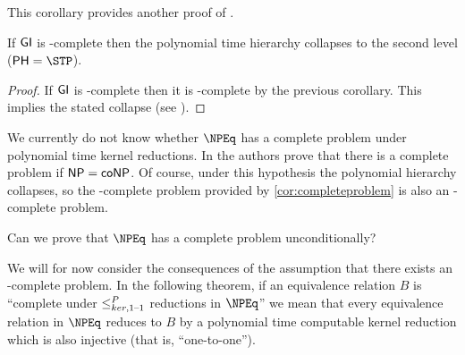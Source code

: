 This corollary provides another proof of \cite[Proposition~8.1]{bcffm}.

\begin{proposition}
  If ${\mathsf{GI}}$ is \NPEq-complete then the polynomial time hierarchy collapses to the second level ($\PH=\STP$).
\end{proposition}
\begin{proof}
  If ${\mathsf{GI}}$ is \NPEq-complete then it is \NP-complete by the previous corollary.
  This implies the stated collapse (see \cite{schoning87}).
\end{proof}

We currently do not know whether $\NPEq$ has a complete problem under polynomial time kernel reductions.
In \cite{bcffm} the authors prove that there is a complete problem if ${\mathsf{NP}}={\mathsf{coNP}}$.
Of course, under this hypothesis the polynomial hierarchy collapses, so the \NPcoNPEq-complete problem provided by \autoref{cor:completeproblem} is also an \NPEq-complete problem.
\begin{openproblem}
  Can we prove that $\NPEq$ has a complete problem unconditionally?
\end{openproblem}

We will for now consider the consequences of the assumption that there exists an \NPEq-complete problem.
In the following theorem, if an equivalence relation $B$ is ``complete under $\leq^{P}_{ker,1\text{--}1}$ reductions in $\NPEq$'' we mean that every equivalence relation in $\NPEq$ reduces to $B$ by a polynomial time computable kernel reduction which is also injective (that is, ``one-to-one'').

